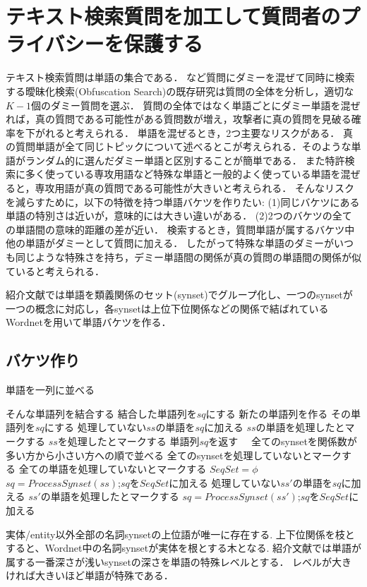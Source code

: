 \documentclass{jsarticle}
\theoremstyle{definition}
\begin{document}
\section{テキスト検索質問を加工して質問者のプライバシーを保護する}
テキスト検索質問は単語の集合である．
\cite{murugesan_providing_2009}など質問にダミーを混ぜて同時に検索する曖昧化検索(Obfuscation Search)の既存研究は質問の全体を分析し，適切な$K-1$個のダミー質問を選ぶ．
質問の全体ではなく単語ごとにダミー単語を混ぜれば，真の質問である可能性がある質問数が増え，攻撃者に真の質問を見破る確率を下がれると考えられる．
単語を混ぜるとき，2つ主要なリスクがある．
真の質問単語が全て同じトピックについて述べるとこが考えられる．そのような単語がランダム的に選んだダミー単語と区別することが簡単である．
また特許検索に多く使っている専攻用語など特殊な単語と一般的よく使っている単語を混ぜると，専攻用語が真の質問である可能性が大きいと考えられる．
そんなリスクを減らすために，以下の特徴を持つ単語バケツを作りたい:
(1)同じバケツにある単語の特別さは近いが，意味的には大きい違いがある．
(2)2つのバケツの全ての単語間の意味的距離の差が近い．
\label{risk}
検索するとき，質問単語が属するバケツ中他の単語がダミーとして質問に加える．
したがって特殊な単語のダミーがいつも同じような特殊さを持ち，デミー単語間の関係が真の質問の単語間の関係が似ていると考えられる．

紹介文献では単語を類義関係のセット(synset)でグループ化し、一つのsynsetが一つの概念に対応し，各synsetは上位下位関係などの関係で結ばれているWordnet\cite{miller_wordnet:_1995}を用いて単語バケツを作る．

\subsection{バケツ作り}
\begin{algorithm}
\caption{単語を一列に並べる}
\begin{algorithmic}[1]
	\State そんな単語列を結合する
	\State 結合した単語列を$sq$にする
	\State 新たの単語列を作る
	\State その単語列を$sq$にする
	\EndIf
	\State 処理していない$ss$の単語を$sq$に加える
	\State $ss$の単語を処理したとマークする
	\State $ss$を処理したとマークする
	\State 単語列$sq$を返す　
\EndFunction
{}
	\State 全てのsynsetを関係数が多い方から小さい方への順で並べる
	\State 全てのsynsetを処理していないとマークする
	\State 全ての単語を処理していないとマークする
	\State $SeqSet = \phi$
		\State $sq=ProcessSynset(ss)$;$sq$を$SeqSet$に加える
		\State 処理していない$ss'$の単語を$sq$に加える
		\State $ss'$の単語を処理したとマークする
		\State $sq=ProcessSynset(ss')$;$sq$を$SeqSet$に加える　
		\EndFor
	\EndFor
\EndFunction
\end{algorithmic}
\end{algorithm}
実体/entity以外全部の名詞synsetの上位語が唯一に存在する.
上下位関係を枝とすると、Wordnet中の名詞synsetが実体を根とする木となる.
紹介文献では単語が属する一番深さが浅いsynsetの深さを単語の特殊レベルとする．
レベルが大きければ大きいほど単語が特殊である．
\end{document}
